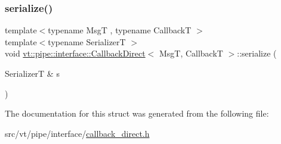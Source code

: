 \mbox{\label{structvt_1_1pipe_1_1interface_1_1_callback_direct_aeced2f2397fdb5bf3778f16036843eda}} 
\subsubsection{\texorpdfstring{serialize()}{serialize()}}
{\footnotesize\ttfamily template$<$typename MsgT , typename CallbackT $>$ \\
template$<$typename SerializerT $>$ \\
void \hyperlink{structvt_1_1pipe_1_1interface_1_1_callback_direct}{vt\+::pipe\+::interface\+::\+Callback\+Direct}$<$ MsgT, CallbackT $>$\+::serialize (\begin{DoxyParamCaption}\item[{SerializerT \&}]{s }\end{DoxyParamCaption})\hspace{0.3cm}{\ttfamily [inline]}}



The documentation for this struct was generated from the following file\+:\begin{DoxyCompactItemize}
\item 
src/vt/pipe/interface/\hyperlink{callback__direct_8h}{callback\+\_\+direct.\+h}\end{DoxyCompactItemize}
